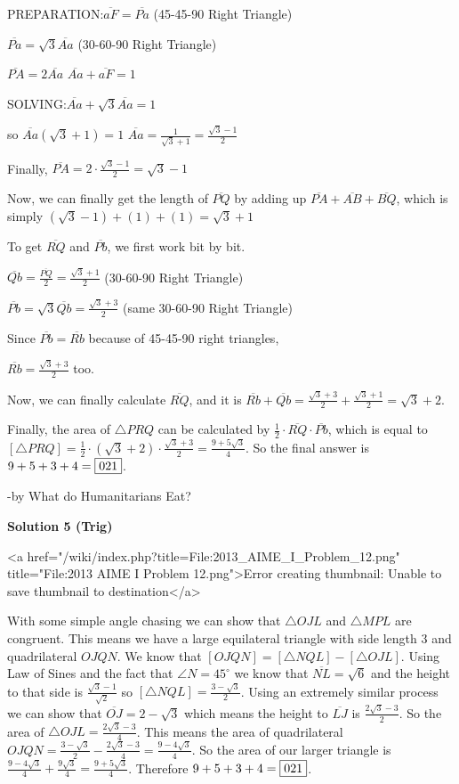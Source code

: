 \begin{enumerate}
 PREPARATION:$\overline{aF}=\overline{Pa}$ (45-45-90 Right Triangle)

 $\overline{Pa}=\sqrt{3}\overline{Aa}$ (30-60-90 Right Triangle)

 $\overline{PA}=2\overline{Aa}$
$\overline{Aa}+\overline{aF}=1$

 SOLVING:$\overline{Aa}+\sqrt{3}\overline{Aa}=1$

 so $\overline{Aa}(\sqrt{3}+1)=1$
$\overline{Aa}=\frac{1}{\sqrt{3}+1}=\frac{\sqrt{3}-1}{2}$

 Finally, $\overline{PA}=2\cdot\frac{\sqrt{3}-1}{2}=\sqrt{3}-1$

 
Now, we can finally get the length of $\overline{PQ}$ by adding up $\overline{PA}+\overline{AB}+\overline{BQ}$, which is simply $(\sqrt{3}-1)+(1)+(1)=\sqrt{3}+1$

 
To get $\overline{RQ}$ and $\overline{Pb}$, we first work bit by bit.

 $\overline{Qb}=\frac{\overline{PQ}}{2}=\frac{\sqrt{3}+1}{2}$ (30-60-90 Right Triangle)

 $\overline{Pb}=\sqrt{3}\overline{Qb}=\frac{\sqrt{3}+3}{2}$ (same 30-60-90 Right Triangle)

 Since $\overline{Pb}=\overline{Rb}$ because of 45-45-90 right triangles, 

 $\overline{Rb}=\frac{\sqrt{3}+3}{2}$ too.

 Now, we can finally calculate $\overline{RQ}$, and it is $\overline{Rb}+\overline{Qb}=\frac{\sqrt{3}+3}{2}+\frac{\sqrt{3}+1}{2}=\sqrt{3}+2$.

 Finally, the area of $\triangle PRQ$ can be calculated by $\frac{1}{2}\cdot\overline{RQ}\cdot\overline{Pb}$, which is equal to $[\triangle PRQ]=\frac{1}{2} \cdot (\sqrt{3}+2) \cdot \frac{\sqrt{3}+3}{2} =\frac{9+5\sqrt{3}}{4}$. So the final answer is $9+5+3+4=\fbox{021}$.

 -by What do Humanitarians Eat?

 



\textbf{Solution 5 (Trig)}

<a href="/wiki/index.php?title=File:2013\_AIME\_I\_Problem\_12.png" title="File:2013 AIME I Problem 12.png">Error creating thumbnail: Unable to save thumbnail to destination</a>

 With some simple angle chasing we can show that $\triangle OJL$ and $\triangle MPL$ are congruent. This means we have a large equilateral triangle with side length $3$ and quadrilateral $OJQN$. We know that $[OJQN] = [\triangle NQL] - [\triangle OJL]$. Using Law of Sines and the fact that $\angle N = 45^{\circ}$ we know that $\overline{NL} = \sqrt{6}$ and the height to that side is $\frac{\sqrt{3} -1}{\sqrt{2}}$ so $[\triangle NQL] = \frac{3-\sqrt{3}}{2}$. Using an extremely similar process we can show that $\overline{OJ} = 2-\sqrt{3}$ which means the height to $\overline{LJ}$ is $\frac{2\sqrt{3}-3}{2}$. So the area of $\triangle OJL = \frac{2\sqrt{3}-3}{4}$. This means the area of quadrilateral $OJQN = \frac{3-\sqrt{3}}{2} - \frac{2\sqrt{3}-3}{4} = \frac{9-4\sqrt{3}}{4}$. So the area of our larger triangle is $\frac{9-4\sqrt{3}}{4} + \frac{9\sqrt{3}}{4} = \frac{9+5\sqrt{3}}{4}$. Therefore $9+5+3+4=\fbox{021}$.


\end{enumerate}
